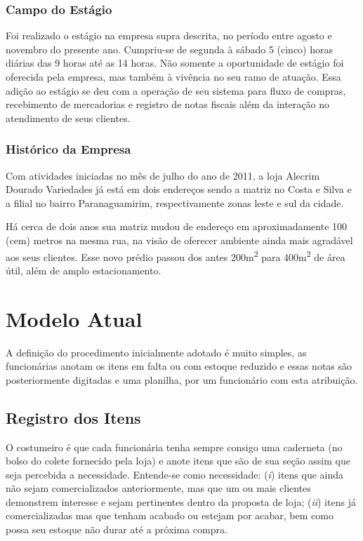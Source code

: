 \documentclass[
	12pt,
	openright,
	oneside, %
	a4paper,
	chapter=TITLE,
	section=TITLE,
	english,
	brazil %
	]{abntex2-udesc}
\begin{document}
\subsection{Campo do Estágio}

Foi realizado o estágio na empresa supra descrita, no período entre agosto e novembro do presente ano. Cumpriu-se de segunda à sábado 5 (cinco) horas diárias das 9 horas até as 14 horas. Não somente a oportunidade de estágio foi oferecida pela empresa, mas também à vivência no seu ramo de atuação. Essa adição ao estágio se deu com a operação de seu sistema para fluxo de compras, recebimento de mercadorias e registro de notas fiscais além da interação no atendimento de seus clientes.

\subsection{Histórico da Empresa}

Com atividades iniciadas no mês de julho do ano de 2011, a loja Alecrim Dourado Variedades já está em dois endereços sendo a matriz no Costa e Silva e a filial no bairro Paranaguamirim, respectivamente zonas leste e sul da cidade.

Há cerca de dois anos sua matriz mudou de endereço em aproximadamente 100 (cem) metros na mesma rua, na visão de oferecer ambiente ainda mais agradável aos seus clientes. Esse novo prédio passou dos antes 200m\textsuperscript{2} para 400m\textsuperscript{2} de área útil, além de amplo estacionamento.

\chapter{Modelo Atual}

A definição do procedimento inicialmente adotado é muito simples, as funcionárias anotam os itens em falta ou com estoque reduzido e essas notas são posteriormente digitadas e uma planilha, por um funcionário com esta atribuição.

\section{Registro dos Itens}

O costumeiro é que cada funcionária tenha sempre consigo uma caderneta (no bolso do colete fornecido pela loja) e anote itens que são de sua seção assim que seja percebida a necessidade. Entende-se como necessidade: (\textit{i}) itens que ainda não sejam comercializados anteriormente, mas que um ou mais clientes demonstrem interesse e sejam pertinentes dentro da proposta de loja; (\textit{ii}) itens já comercializadas mas que tenham acabado ou estejam por acabar, bem como possa seu estoque não durar até a próxima compra.
\end{document}
